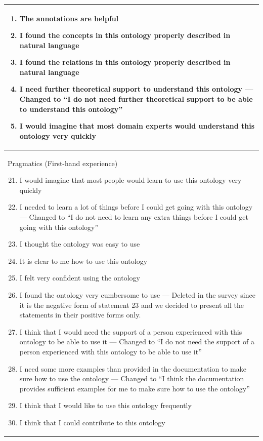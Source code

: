 \begin{longtable}{p{\textwidth}}
\begin{enumerate}
		\item The annotations are helpful
		\item I found the concepts in this ontology properly described in natural language
		\item I found the relations in this ontology properly described in natural language
		\item I need further theoretical support to understand this ontology --- Changed to ``I do not need further theoretical support to be able to understand this ontology''
		\item I would imagine that most domain experts would understand this ontology very quickly
	\end{enumerate} \\
	\hline
	Pragmatics (First-hand experience)
	\begin{enumerate}
		\setcounter{enumi}{20}
		\item I would imagine that most people would learn to use this ontology very quickly
		\item I needed to learn a lot of things before I could get going with this ontology --- Changed to ``I do not need to learn any extra things before I could get going with this ontology''
		\item I thought the ontology was easy to use
		\item It is clear to me how to use this ontology
		\item I felt very confident using the ontology
		\item I found the ontology very cumbersome to use --- Deleted in the survey since it is the negative form of statement 23 and we decided to present all the statements in their positive forms only.
		\item I think that I would need the support of a person experienced with this ontology to be able to use it --- Changed to ``I do not need the support of a person experienced with this ontology to be able to use it''
		\item I need some more examples than provided in the documentation to make sure how to use the ontology --- Changed to ``I think the documentation provides sufficient examples for me to make sure how to use the ontology''
		\item I think that I would like to use this ontology frequently
		\item I think that I could contribute to this ontology
	\end{enumerate} \\
	\hline
\end{longtable}
